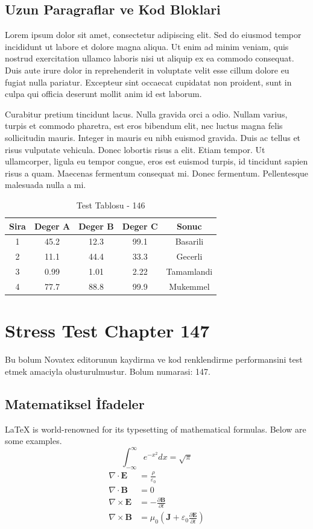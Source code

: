 \documentclass[12pt,a4paper]{article}
\begin{document}
\subsection{Uzun Paragraflar ve Kod Bloklari}
Lorem ipsum dolor sit amet, consectetur adipiscing elit. Sed do eiusmod tempor incididunt ut labore et dolore magna aliqua. Ut enim ad minim veniam, quis nostrud exercitation ullamco laboris nisi ut aliquip ex ea commodo consequat. Duis aute irure dolor in reprehenderit in voluptate velit esse cillum dolore eu fugiat nulla pariatur. Excepteur sint occaecat cupidatat non proident, sunt in culpa qui officia deserunt mollit anim id est laborum.

Curabitur pretium tincidunt lacus. Nulla gravida orci a odio. Nullam varius, turpis et commodo pharetra, est eros bibendum elit, nec luctus magna felis sollicitudin mauris. Integer in mauris eu nibh euismod gravida. Duis ac tellus et risus vulputate vehicula. Donec lobortis risus a elit. Etiam tempor. Ut ullamcorper, ligula eu tempor congue, eros est euismod turpis, id tincidunt sapien risus a quam. Maecenas fermentum consequat mi. Donec fermentum. Pellentesque malesuada nulla a mi.

\begin{table}[h!]
\centering
\begin{tabular}{|c|c|c|c|c|}
\hline
\textbf{Sira} & \textbf{Deger A} & \textbf{Deger B} & \textbf{Deger C} & \textbf{Sonuc} \\
\hline
1 & 45.2 & 12.3 & 99.1 & Basarili \\
2 & 11.1 & 44.4 & 33.3 & Gecerli \\
3 & 0.99 & 1.01 & 2.22 & Tamamlandi \\
4 & 77.7 & 88.8 & 99.9 & Mukemmel \\
\hline
\end{tabular}
\caption{Test Tablosu - 146}
\end{table}

\newpage
\section{Stress Test Chapter 147}
Bu bolum Novatex editorunun kaydirma ve kod renklendirme performansini test etmek amaciyla olusturulmustur. Bolum numarasi: 147.

\subsection{Matematiksel İfadeler}
\LaTeX{} is world-renowned for its typesetting of mathematical formulas. Below are some examples.
\begin{equation}
\int_{-\infty}^{\infty} e^{-x^2} dx = \sqrt{\pi}
\end{equation}
\begin{align}
\nabla \cdot \mathbf{E} &= \frac{\rho}{\varepsilon_0} \\
\nabla \cdot \mathbf{B} &= 0 \\
\nabla \times \mathbf{E} &= -\frac{\partial \mathbf{B}}{\partial t} \\
\nabla \times \mathbf{B} &= \mu_0\left(\mathbf{J} + \varepsilon_0 \frac{\partial \mathbf{E}}{\partial t}\right)
\end{align}
\end{document}
